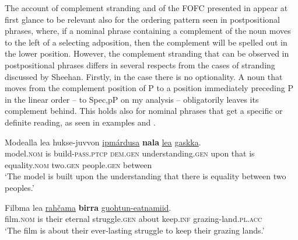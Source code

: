 \documentclass[output=paper]{LSP/langsci}
\begin{document}
The account of complement stranding and of the FOFC presented in \citet{Sheehan2009} appear at first glance to be relevant also for the ordering pattern seen in  postpositional phrases, where, if a nominal phrase containing a complement of the noun moves to the left of a selecting adposition, then the complement will be spelled out in the lower position. However, the complement stranding that can be observed in  postpositional phrases differs in several respects from the cases of stranding discussed by Sheehan. Firstly, in the  case there is no optionality. A noun that moves from the complement position of P to a position immediately preceding P in the linear order – to Spec,pP on my analysis – obligatorily leaves its complement behind. This holds also for nominal phrases that get a specific or definite reading, as seen in examples  and .

\ea%
    \label{ex:julien:25}
   
  \gll	  Modealla  lea    hukse-juvvon          \uline{ipmárdusa}        \textbf{nala}   \uline{lea}              \uline{gaskka}.\\
    model.\textsc{nom}  is    build-\textsc{pass.ptcp}  \textsc{dem}.\textsc{gen}  understanding.\textsc{gen}  upon    that  is    equality.\textsc{nom}  two.\textsc{gen}  people.\textsc{gen}  between\\
\glt  ‘The model is built upon the understanding that there is equality between two peoples.’
\z

\ea%
    \label{ex:julien:26}
   
    \gll   Filbma    lea          \uline{rahčama}      \textbf{birra}          \uline{guohtun-eatnamiid}. \\ 
	  film.\textsc{nom}  is    their  eternal  struggle.\textsc{gen}  about    keep.\textsc{inf}    grazing-land.\textsc{pl}.\textsc{acc}\\
    \glt    ‘The film is about their ever-lasting struggle to keep their grazing lands.’
    \z
\end{document}

